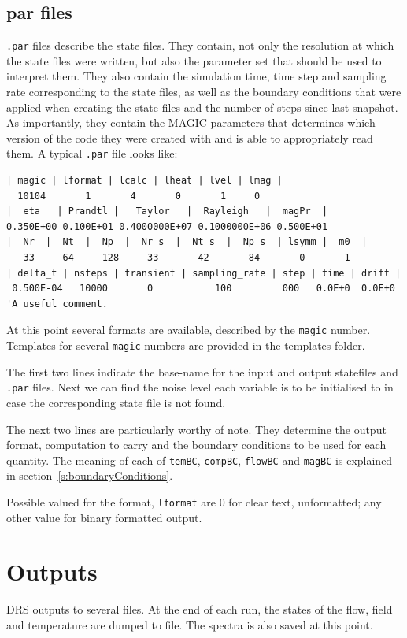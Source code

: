 \documentclass[a4paper,10pt]{book}
\begin{document}
\subsection{par files}
\label{s:parFiles}
\verb|.par| files describe the state files. They contain, not only the
resolution at which the state files were written, but also the parameter set that
should be used to interpret them. They also contain the simulation time, time
step and sampling rate corresponding to the state files, as well as the
boundary conditions that were applied when creating the state files and the
number of steps since last snapshot. As importantly, they contain the MAGIC
parameters that determines which version of the code they were created with and
is able to appropriately read them. A typical \verb|.par| file looks like:
{\small
\begin{verbatim}
| magic | lformat | lcalc | lheat | lvel | lmag |
  10104       1       4       0       1     0
|  eta   | Prandtl |   Taylor   |  Rayleigh   |  magPr  |
0.350E+00 0.100E+01 0.4000000E+07 0.1000000E+06 0.500E+01
|  Nr  |  Nt  |  Np  |  Nr_s  |  Nt_s  |  Np_s  | lsymm |  m0  |
   33     64     128     33       42       84       0       1
| delta_t | nsteps | transient | sampling_rate | step | time | drift |
 0.500E-04   10000       0           100         000   0.0E+0  0.0E+0
'A useful comment.
\end{verbatim}
}

At this point several formats are available, described by the \verb|magic|
number. Templates for several \verb|magic| numbers are provided in the
templates folder.

The first two lines indicate the base-name for the input and output statefiles
and \verb|.par| files. Next we can find the noise level each variable is to be
initialised to in case the corresponding state file is not found.

The next two lines are particularly worthy of note. They determine the output
format, computation to carry and the boundary conditions to be used for each
quantity. The meaning of each of \verb|temBC|, \verb|compBC|, \verb|flowBC| and
\verb|magBC| is explained in section~\ref{s:boundaryConditions}.

Possible valued for the format, \verb|lformat| are 0 for clear text, unformatted;
any other value for binary formatted output.

\section{Outputs}
\label{outputs}
DRS outputs to several files. At the end of each run, the states of the flow,
field and temperature are dumped to file. The spectra is also saved at this
point.
\end{document}
